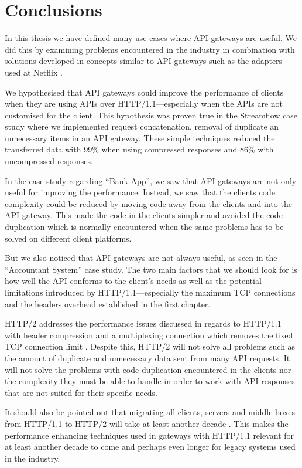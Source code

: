 \documentclass{cslthse-msc}
\begin{document}
\chapter{Conclusions}
In this thesis we have defined many use cases where API gateways are useful. We did this by examining problems encountered in the industry in combination with solutions developed in concepts similar to API gateways such as the adapters used at Netflix \cite{netflix}.

We hypothesised that API gateways could improve the performance of clients when they are using APIs over HTTP/1.1---especially when the APIs are not customised for the client. This hypothesis was proven true in the Streamflow case study where we implemented request concatenation, removal of duplicate an unnecessary items in an API gateway. These simple techniques reduced the transferred data with 99\% when using compressed responses and 86\% with uncompressed responses. 

In the case study regarding \enquote{Bank App}, we saw that API gateways are not only useful for improving the performance. Instead, we saw that the clients code complexity could be reduced by moving code away from the clients and into the API gateway. This made the code in the clients simpler and avoided the code duplication which is normally encountered when the same problems has to be solved on different client platforms.

But we also noticed that API gateways are not always useful, as seen in the \enquote{Accountant System} case study. The two main factors that we should look for is how well the API conforms to the client's needs as well as the potential limitations introduced by HTTP/1.1---especially the maximum TCP connections and the headers overhead established in the first chapter.

HTTP/2 addresses the performance issues discussed in regards to HTTP/1.1 with header compression \cite{header_compression} and a multiplexing connection which removes the fixed TCP connection limit \cite{hpbn2}. Despite this, HTTP/2 will not solve all problems such as the amount of duplicate and unnecessary data sent from many API requests. It will not solve the problems with code duplication encountered in the clients nor the complexity they must be able to handle in order to work with API responses that are not suited for their specific needs.

It should also be pointed out that migrating all clients, servers and middle boxes from HTTP/1.1 to HTTP/2 will take at least another decade \cite{hpbn2}. This makes the performance enhancing techniques used in gateways with HTTP/1.1 relevant for at least another decade to come and perhaps even longer for legacy systems used in the industry.
\end{document}
